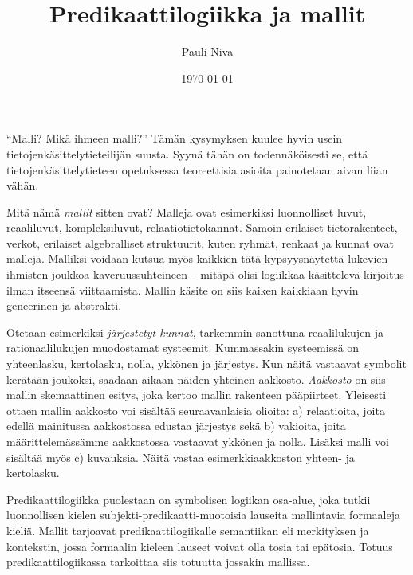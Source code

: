 \documentclass[finnish]{tktltiki2}
\title{Predikaattilogiikka ja mallit}
\author{Pauli Niva}
\date{\today}
\theoremstyle{definition}
\theoremstyle{remark}
\begin{document}

\frontmatter      %

\maketitle        %



\mainmatter       %


\noindent
``Malli? Mikä ihmeen malli?'' Tämän kysymyksen kuulee hyvin usein tietojenkäsittelytieteilijän suusta. Syynä tähän on todennäköisesti se, että tietojenkäsittelytieteen opetuksessa teoreettisia asioita painotetaan aivan liian vähän.

Mitä nämä \textit{mallit} sitten ovat? Malleja ovat esimerkiksi luonnolliset luvut, reaaliluvut, kompleksiluvut, relaatiotietokannat. Samoin erilaiset tietorakenteet, verkot, erilaiset algebralliset struktuurit, kuten ryhmät, renkaat ja kunnat ovat malleja. Malliksi voidaan kutsua myös kaikkien tätä kypsyysnäytettä lukevien ihmisten joukkoa kaveruussuhteineen -- mitäpä olisi logiikkaa käsittelevä kirjoitus ilman itseensä viittaamista. Mallin käsite on siis kaiken kaikkiaan hyvin geneerinen ja abstrakti.

Otetaan esimerkiksi \textit{järjestetyt kunnat}, tarkemmin sanottuna reaalilukujen ja rationaalilukujen muodostamat systeemit. Kummassakin systeemissä on yhteenlasku, kertolasku, nolla, ykkönen ja järjestys. Kun näitä vastaavat symbolit kerätään joukoksi, saadaan aikaan näiden yhteinen aakkosto. \textit{Aakkosto} on siis mallin skemaattinen esitys, joka kertoo mallin rakenteen pääpiirteet. Yleisesti ottaen mallin aakkosto voi sisältää seuraavanlaisia olioita: a) relaatioita, joita edellä mainitussa aakkostossa edustaa järjestys sekä b) vakioita, joita määrittelemässämme aakkostossa vastaavat ykkönen ja nolla. Lisäksi malli voi sisältää myös c) kuvauksia. Näitä vastaa esimerkkiaakkoston yhteen- ja kertolasku.

Predikaattilogiikka puolestaan on symbolisen logiikan osa-alue, joka tutkii luonnollisen kielen subjekti-predikaatti-muotoisia lauseita mallintavia formaaleja kieliä. Mallit tarjoavat predikaattilogiikalle semantiikan eli merkityksen ja kontekstin, jossa formaalin kieleen lauseet voivat olla tosia tai epätosia. Totuus predikaattilogiikassa tarkoittaa siis totuutta jossakin mallissa.
\end{document}
